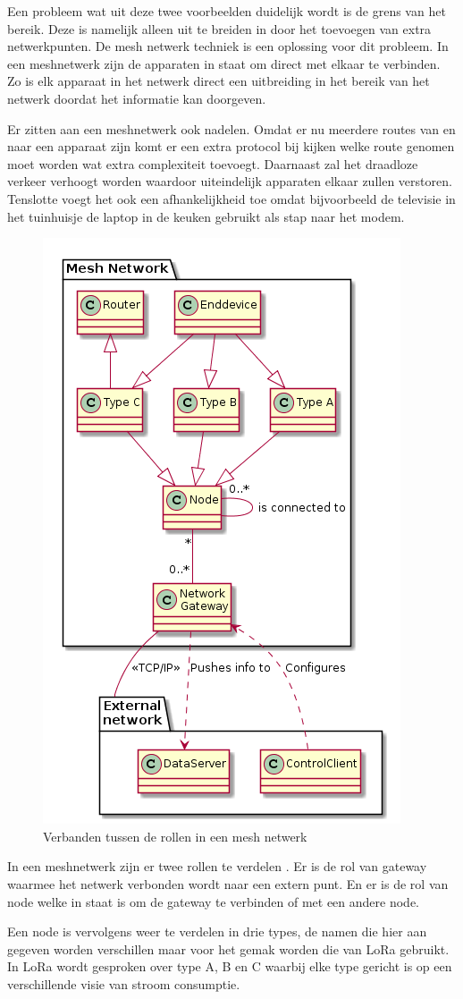 \documentclass[a4paper, 11pt, oneside]{report}
\begin{document}
Een probleem wat uit deze twee voorbeelden duidelijk wordt is de grens van het bereik. 
Deze is namelijk alleen uit te breiden in door het toevoegen van extra netwerkpunten.
De mesh netwerk techniek is een oplossing voor dit probleem.
In een meshnetwerk zijn de apparaten in staat om direct met elkaar te verbinden. 
Zo is elk apparaat in het netwerk direct een uitbreiding in het bereik van het netwerk doordat het informatie kan doorgeven.

Er zitten aan een meshnetwerk ook nadelen.
Omdat er nu meerdere routes van en naar een apparaat zijn komt er een extra protocol bij kijken welke route genomen moet worden wat extra complexiteit toevoegt.
Daarnaast zal het draadloze verkeer verhoogt worden waardoor uiteindelijk apparaten elkaar zullen verstoren.
Tenslotte voegt het ook een afhankelijkheid toe omdat bijvoorbeeld de televisie in het tuinhuisje de laptop in de keuken gebruikt als stap naar het modem.


\begin{figure}[H]
	\begin{center}\includegraphics[width=.3\linewidth]{meshclass}\end{center}
	\caption{Verbanden tussen de rollen in een mesh netwerk}
	\label{fig:meshrol}
\end{figure}

In een meshnetwerk zijn er twee rollen te verdelen \cite{compNRF}.
Er is de rol van gateway waarmee het netwerk verbonden wordt naar een extern punt. 
En er is de rol van node welke in staat is om de gateway te verbinden of met een andere node.

Een node is vervolgens weer te verdelen in drie types, de namen die hier aan gegeven worden verschillen maar voor het gemak worden die van LoRa gebruikt.
In LoRa wordt gesproken over type A, B en C waarbij elke type gericht is op een verschillende visie van stroom consumptie\cite{LoraLimit}.
\end{document}
